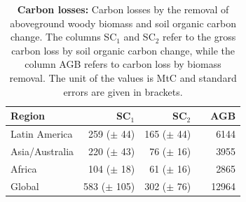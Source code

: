 		\begin{table}[ht]
			\centering
			\caption[Carbon losses]{\textbf{Carbon losses:} Carbon losses by the removal of aboveground woody biomass and soil organic carbon change. The columns SC$_1$ and SC$_2$ refer to the gross carbon loss by soil organic carbon change, while the column AGB refers to carbon loss by biomass removal. The unit of the values is MtC and standard errors are given in brackets.}
			\label{tab:soce_tab}
			\begin{tabular}{lrrrr}
				\hline
				Region & SC$_1$ & SC$_2$ && AGB\\\hline
				Latin America & 259 ($\pm$ 44) & 165 ($\pm$ 44) && 6144\\
				Asia/Australia & 220 ($\pm$ 43) & 76 ($\pm$ 16) && 3955\\
				Africa & 104 ($\pm$ 18) & 61 ($\pm$ 16) && 2865\\
				Global & 583 ($\pm$ 105) & 302 ($\pm$ 76) && 12964\\\hline
			\end{tabular}
		\end{table}

